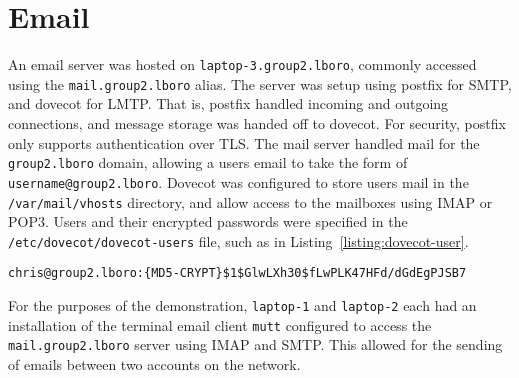 \section{Email}
    An email server was hosted on \texttt{laptop-3.group2.lboro}, commonly
    accessed using the \texttt{mail.group2.lboro} alias. The server was setup
    using postfix for SMTP, and dovecot for LMTP. That is, postfix handled
    incoming and outgoing connections, and message storage was handed off to
    dovecot. For security, postfix only supports authentication over TLS. The
    mail server handled mail for the \texttt{group2.lboro} domain, allowing a
    users email to take the form of \texttt{username@group2.lboro}. Dovecot was
    configured to store users mail in the \texttt{/var/mail/vhosts} directory,
    and allow access to the mailboxes using IMAP or POP3. Users and their
    encrypted passwords were specified in the \texttt{/etc/dovecot/dovecot-users}
    file, such as in Listing~\ref{listing:dovecot-user}.

    \begin{lstlisting}[caption={Dovecot user}, label={listing:dovecot-user}]
chris@group2.lboro:{MD5-CRYPT}$1$GlwLXh30$fLwPLK47HFd/dGdEgPJSB7
    \end{lstlisting}

    For the purposes of the demonstration, \texttt{laptop-1} and \texttt
    {laptop-2} each had an installation of the terminal email client \texttt
    {mutt} configured to access the \texttt{mail.group2.lboro} server using
    IMAP and SMTP. This allowed for the sending of emails between two accounts
    on the network.

